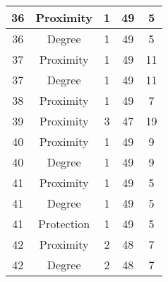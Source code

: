 \documentclass[results.tex]{subfiles}
\begin{document}
\begin{center}
\begin{tabular}{| c || c | c | c | c |}
            \hline
            36                      & Proximity                    & 1                      & 49                      & 5                    \\
            \hline
            36                      & Degree                       & 1                      & 49                      & 5                    \\
            \hline
            37                      & Proximity                    & 1                      & 49                      & 11                   \\
            \hline
            37                      & Degree                       & 1                      & 49                      & 11                   \\
            \hline
            38                      & Proximity                    & 1                      & 49                      & 7                    \\
            \hline
            39                      & Proximity                    & 3                      & 47                      & 19                   \\
            \hline
            40                      & Proximity                    & 1                      & 49                      & 9                    \\
            \hline
            40                      & Degree                       & 1                      & 49                      & 9                    \\
            \hline
            41                      & Proximity                    & 1                      & 49                      & 5                    \\
            \hline
            41                      & Degree                       & 1                      & 49                      & 5                    \\
            \hline
            41                      & Protection                   & 1                      & 49                      & 5                    \\
            \hline
            42                      & Proximity                    & 2                      & 48                      & 7                    \\
            \hline
            42                      & Degree                       & 2                      & 48                      & 7                    \\

\end{tabular}
\end{center}
\end{document}
